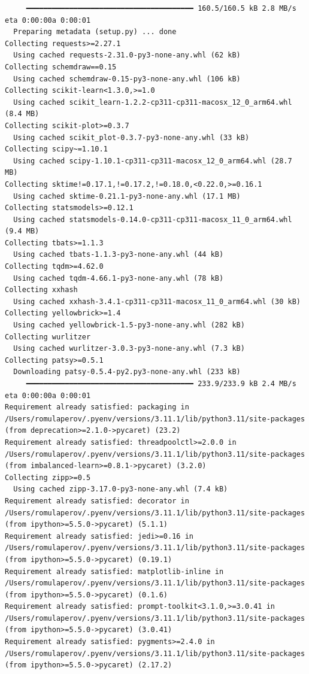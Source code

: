 \documentclass[
  letterpaper,
  DIV=11,
  numbers=noendperiod]{scrartcl}
\begin{document}
\begin{verbatim}
     ━━━━━━━━━━━━━━━━━━━━━━━━━━━━━━━━━━━━━━━ 160.5/160.5 kB 2.8 MB/s eta 0:00:00a 0:00:01
  Preparing metadata (setup.py) ... done
Collecting requests>=2.27.1
  Using cached requests-2.31.0-py3-none-any.whl (62 kB)
Collecting schemdraw==0.15
  Using cached schemdraw-0.15-py3-none-any.whl (106 kB)
Collecting scikit-learn<1.3.0,>=1.0
  Using cached scikit_learn-1.2.2-cp311-cp311-macosx_12_0_arm64.whl (8.4 MB)
Collecting scikit-plot>=0.3.7
  Using cached scikit_plot-0.3.7-py3-none-any.whl (33 kB)
Collecting scipy~=1.10.1
  Using cached scipy-1.10.1-cp311-cp311-macosx_12_0_arm64.whl (28.7 MB)
Collecting sktime!=0.17.1,!=0.17.2,!=0.18.0,<0.22.0,>=0.16.1
  Using cached sktime-0.21.1-py3-none-any.whl (17.1 MB)
Collecting statsmodels>=0.12.1
  Using cached statsmodels-0.14.0-cp311-cp311-macosx_11_0_arm64.whl (9.4 MB)
Collecting tbats>=1.1.3
  Using cached tbats-1.1.3-py3-none-any.whl (44 kB)
Collecting tqdm>=4.62.0
  Using cached tqdm-4.66.1-py3-none-any.whl (78 kB)
Collecting xxhash
  Using cached xxhash-3.4.1-cp311-cp311-macosx_11_0_arm64.whl (30 kB)
Collecting yellowbrick>=1.4
  Using cached yellowbrick-1.5-py3-none-any.whl (282 kB)
Collecting wurlitzer
  Using cached wurlitzer-3.0.3-py3-none-any.whl (7.3 kB)
Collecting patsy>=0.5.1
  Downloading patsy-0.5.4-py2.py3-none-any.whl (233 kB)
     ━━━━━━━━━━━━━━━━━━━━━━━━━━━━━━━━━━━━━━━ 233.9/233.9 kB 2.4 MB/s eta 0:00:00a 0:00:01
Requirement already satisfied: packaging in /Users/romulaperov/.pyenv/versions/3.11.1/lib/python3.11/site-packages (from deprecation>=2.1.0->pycaret) (23.2)
Requirement already satisfied: threadpoolctl>=2.0.0 in /Users/romulaperov/.pyenv/versions/3.11.1/lib/python3.11/site-packages (from imbalanced-learn>=0.8.1->pycaret) (3.2.0)
Collecting zipp>=0.5
  Using cached zipp-3.17.0-py3-none-any.whl (7.4 kB)
Requirement already satisfied: decorator in /Users/romulaperov/.pyenv/versions/3.11.1/lib/python3.11/site-packages (from ipython>=5.5.0->pycaret) (5.1.1)
Requirement already satisfied: jedi>=0.16 in /Users/romulaperov/.pyenv/versions/3.11.1/lib/python3.11/site-packages (from ipython>=5.5.0->pycaret) (0.19.1)
Requirement already satisfied: matplotlib-inline in /Users/romulaperov/.pyenv/versions/3.11.1/lib/python3.11/site-packages (from ipython>=5.5.0->pycaret) (0.1.6)
Requirement already satisfied: prompt-toolkit<3.1.0,>=3.0.41 in /Users/romulaperov/.pyenv/versions/3.11.1/lib/python3.11/site-packages (from ipython>=5.5.0->pycaret) (3.0.41)
Requirement already satisfied: pygments>=2.4.0 in /Users/romulaperov/.pyenv/versions/3.11.1/lib/python3.11/site-packages (from ipython>=5.5.0->pycaret) (2.17.2)

\end{verbatim}
\end{document}
